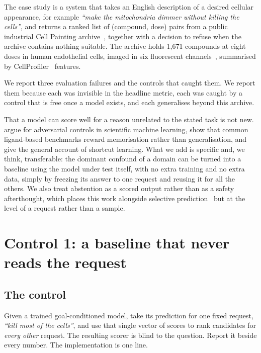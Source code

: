 \documentclass[letterpaper]{article}
\begin{document}
The case study is a system that takes an English description of a desired cellular
appearance, for example \emph{``make the mitochondria dimmer without killing the
cells''}, and returns a ranked list of (compound, dose) pairs from a public industrial
Cell Painting archive~\citep{kraus2025rxrx3core}, together with a decision to refuse
when the archive contains nothing suitable. The archive holds 1{,}671 compounds at
eight doses in human endothelial cells, imaged in six fluorescent
channels~\citep{bray2016cellpainting}, summarised by
CellProfiler~\citep{carpenter2006cellprofiler} features.

We report three evaluation failures and the controls that caught them. We report them
because each was invisible in the headline metric, each was caught by a control that is
free once a model exists, and each generalises beyond this archive.

That a model can score well for a reason unrelated to the stated task is not new.
\citet{chuang2018adversarial} argue for adversarial controls in scientific machine
learning, \citet{wallach2018memorization} show that common ligand-based benchmarks
reward memorisation rather than generalisation, and \citet{geirhos2020shortcut} give
the general account of shortcut learning. What we add is specific and, we think,
transferable: the dominant confound of a domain can be turned into a baseline using
the model under test itself, with no extra training and no extra data, simply by
freezing its answer to one request and reusing it for all the others. We also treat
abstention as a scored output rather than as a safety afterthought, which places this
work alongside selective prediction~\citep{geifman2017selective} but at the level of a
request rather than a sample.

\section{Control 1: a baseline that never reads the request}

\subsection{The control}

Given a trained goal-conditioned model, take its prediction for one fixed request,
\emph{``kill most of the cells''}, and use that single vector of scores to rank
candidates for \emph{every other} request. The resulting scorer is blind to the
question. Report it beside every number. The implementation is one line.
\end{document}
